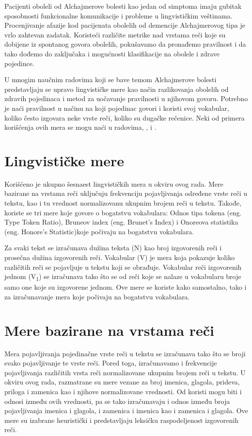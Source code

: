 \documentclass[12pt,oneside]{memoir}
\begin{document}
Pacijenti oboleli od Alchajmerove bolesti kao jedan od simptoma imaju gubitak sposobnosti funkcionalne komunikacije i probleme u lingvističkim veštinama. Procenjivanje afazije kod pacijenata obolelih od demencije Alchajmerovog tipa je vrlo zahtevan zadatak. Koristeći različite metrike nad vrstama reči koje su dobijene iz spontanog govora obolelih, pokušavamo da pronađemo pravilnost i da tako dođemo do zaključaka i mogućnosti klasifikacije na obolele i zdrave pojedince.

U mnogim naučnim radovima koji se bave temom Alchajmerove bolesti predstavljaju se upravo lingvističke mere kao način razlikovanja obolelih od zdravih pojedinaca i metod za uočavanje pravilnosti u njihovom govoru. Potrebno je naći pravilnost u načinu na koji pojedinac govori i koristi svoj vokabular, koliko često izgovara neke vrste reči, koliko su dugačke rečenice. Neki od primera korišćenja ovih mera se mogu naći u radovima, \cite{automaticdetandrat}, \cite{Evaloftechfolexicalperformance} i \cite{linguisticfeatures}.

\section{Lingvističke mere}

Korišćeno je ukupno šesnaest lingvističkih mera u okviru ovog rada. Mere bazirane na vrstama reči uključuju frekvenciju pojavljivanja određene vrste reči u tekstu, kao i tu vrednost normalizovanu ukupnim brojem reči u tekstu. Takođe, koriste se tri mere koje govore o bogatstvu vokabulara: Odnos tipa tokena (eng. Type Token Ratio), Bruneov index (eng. Brunet's Index) i Onoreova statistika (eng. Honore's Statistic)koje počivaju na bogatstvu vokabulara\cite{automaticdetandrat}.

Za svaki tekst se izračunava dužina teksta (N) kao broj izgovorenih reči i prosečna dužina izgovorenih reči. Vokabular (V) je mera koja pokazuje koliko različitih reči se pojavljuje u tekstu koji se obrađuje. Vokabular reči izgovorenih jednom (V\textsubscript{1}) se izračunava tako što se od reči koje se nalaze u vokabularu broje samo one koje su izgovorene jednom. Ove mere se koriste kako samostalno, tako i za izračunavanje mera koje počivaju na bogatstvu vokabulara.

\section{Mere bazirane na vrstama reči}

Mera pojavljivanja pojedinačne vrste reči u tekstu se izračunava tako što se broji svako pojavljivanje te vrste reči. Pored toga, izračunavamo i frekvencije pojavljivanja različitih vrsta reči normalizovane ukupnim brojem reči u tekstu. U okviru ovog rada, razmatrane su mere vezane za broj imenica, glagola, prideva, priloga i zamenica kao i njihove normalizovane vrednosti. Od koristi mogu biti i odnosi između ovih vrednosti, pa se tako izračunavaju i odnos između broja pojavljivanja imenica i glagola, i zamenica i imenica kao i zamenica i glagola. Ove mere su izabrane heuristički i predstavljaju leksičku raspodeljenost izgovorenih reči.
\end{document}
